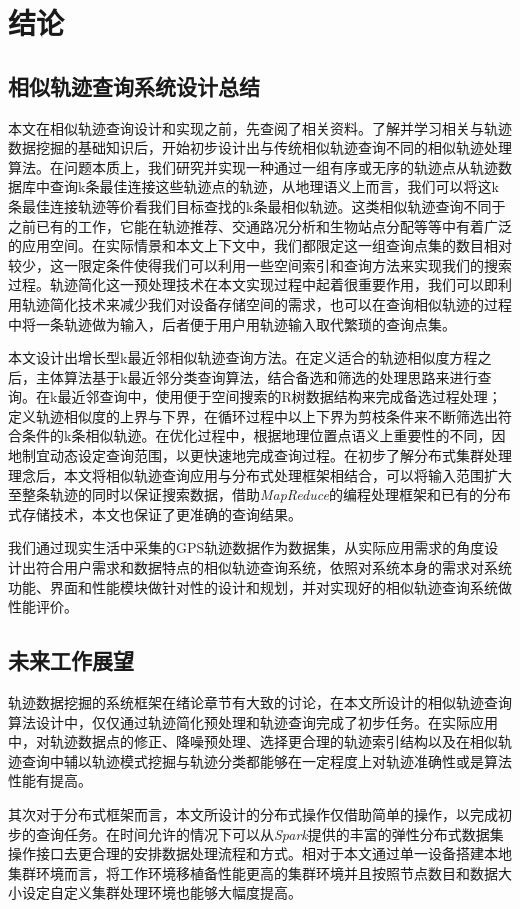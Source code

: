 
\chapter{结论}
\label{chap:conclusion}

\section{相似轨迹查询系统设计总结}
\label{sec:conclusion implemention}
本文在相似轨迹查询设计和实现之前，先查阅了相关资料。了解并学习相关与轨迹数据挖掘的基础知识后，开始初步设计出与传统相似轨迹查询不同的相似轨迹处理算法。在问题本质上，我们研究并实现一种通过一组有序或无序的轨迹点从轨迹数据库中查询k条最佳连接这些轨迹点的轨迹，从地理语义上而言，我们可以将这k条最佳连接轨迹等价看我们目标查找的k条最相似轨迹。这类相似轨迹查询不同于之前已有的工作，它能在轨迹推荐、交通路况分析和生物站点分配等等中有着广泛的应用空间。在实际情景和本文上下文中，我们都限定这一组查询点集的数目相对较少，这一限定条件使得我们可以利用一些空间索引和查询方法来实现我们的搜索过程。轨迹简化这一预处理技术在本文实现过程中起着很重要作用，我们可以即利用轨迹简化技术来减少我们对设备存储空间的需求，也可以在查询相似轨迹的过程中将一条轨迹做为输入，后者便于用户用轨迹输入取代繁琐的查询点集。

本文设计出增长型k最近邻相似轨迹查询方法。在定义适合的轨迹相似度方程之后，主体算法基于k最近邻分类查询算法，结合备选和筛选的处理思路来进行查询。在k最近邻查询中，使用便于空间搜索的R树数据结构来完成备选过程处理；定义轨迹相似度的上界与下界，在循环过程中以上下界为剪枝条件来不断筛选出符合条件的k条相似轨迹。在优化过程中，根据地理位置点语义上重要性的不同，因地制宜动态设定查询范围，以更快速地完成查询过程。在初步了解分布式集群处理理念后，本文将相似轨迹查询应用与分布式处理框架相结合，可以将输入范围扩大至整条轨迹的同时以保证搜索数据，借助\emph{MapReduce}的编程处理框架和已有的分布式存储技术，本文也保证了更准确的查询结果。

我们通过现实生活中采集的GPS轨迹数据作为数据集，从实际应用需求的角度设计出符合用户需求和数据特点的相似轨迹查询系统，依照对系统本身的需求对系统功能、界面和性能模块做针对性的设计和规划，并对实现好的相似轨迹查询系统做性能评价。

\section{未来工作展望}
\label{sec:conclusion future}
轨迹数据挖掘的系统框架在绪论章节有大致的讨论，在本文所设计的相似轨迹查询算法设计中，仅仅通过轨迹简化预处理和轨迹查询完成了初步任务。在实际应用中，对轨迹数据点的修正、降噪预处理、选择更合理的轨迹索引结构以及在相似轨迹查询中辅以轨迹模式挖掘与轨迹分类都能够在一定程度上对轨迹准确性或是算法性能有提高。

其次对于分布式框架而言，本文所设计的分布式操作仅借助简单的操作，以完成初步的查询任务。在时间允许的情况下可以从\emph{Spark}提供的丰富的弹性分布式数据集操作接口去更合理的安排数据处理流程和方式。相对于本文通过单一设备搭建本地集群环境而言，将工作环境移植备性能更高的集群环境并且按照节点数目和数据大小设定自定义集群处理环境也能够大幅度提高。


